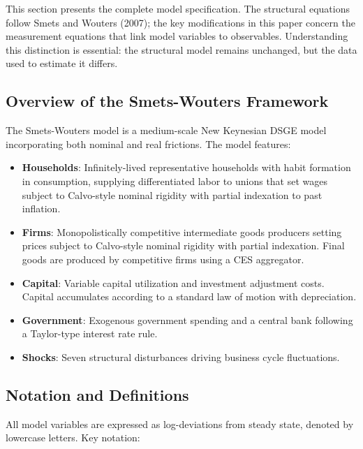 \documentclass[12pt]{article}
\begin{document}
This section presents the complete model specification. The structural equations follow Smets and Wouters (2007); the key modifications in this paper concern the measurement equations that link model variables to observables. Understanding this distinction is essential: the structural model remains unchanged, but the data used to estimate it differs.

\subsection{Overview of the Smets-Wouters Framework}

The Smets-Wouters model is a medium-scale New Keynesian DSGE model incorporating both nominal and real frictions. The model features:

\begin{itemize}
    \item \textbf{Households}: Infinitely-lived representative households with habit formation in consumption, supplying differentiated labor to unions that set wages subject to Calvo-style nominal rigidity with partial indexation to past inflation.
    
    \item \textbf{Firms}: Monopolistically competitive intermediate goods producers setting prices subject to Calvo-style nominal rigidity with partial indexation. Final goods are produced by competitive firms using a CES aggregator.
    
    \item \textbf{Capital}: Variable capital utilization and investment adjustment costs. Capital accumulates according to a standard law of motion with depreciation.
    
    \item \textbf{Government}: Exogenous government spending and a central bank following a Taylor-type interest rate rule.
    
    \item \textbf{Shocks}: Seven structural disturbances driving business cycle fluctuations.
\end{itemize}

\subsection{Notation and Definitions}

All model variables are expressed as log-deviations from steady state, denoted by lowercase letters. Key notation:
\end{document}
